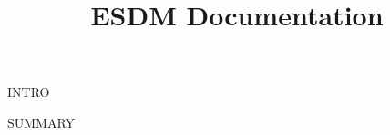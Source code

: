 \documentclass{article}
\title{ESDM Documentation}
\date{}
\author{}
\begin{document}
\maketitle

\tableofcontents

INTRO














SUMMARY 

\end{document}
